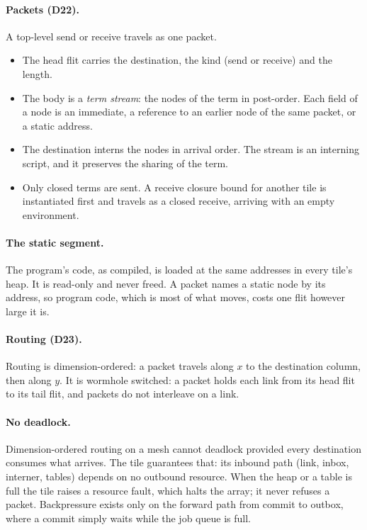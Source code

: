 \documentclass[11pt]{article}
\newcommand{\dec}[1]{\textbf{D#1}}
\theoremstyle{definition}
\theoremstyle{remark}
\begin{document}
\paragraph{Packets (\dec{22}).} A top-level send or receive travels as one
packet.
\begin{itemize}
\item The head flit carries the destination, the kind (send or receive) and
the length.
\item The body is a \emph{term stream}: the nodes of the term in post-order.
Each field of a node is an immediate, a reference to an earlier node of the
same packet, or a static address.
\item The destination interns the nodes in arrival order. The stream is an
interning script, and it preserves the sharing of the term.
\item Only closed terms are sent. A receive closure bound for another tile is
instantiated first and travels as a closed receive, arriving with an empty
environment.
\end{itemize}

\paragraph{The static segment.} The program's code, as compiled, is loaded at
the same addresses in every tile's heap. It is read-only and never freed. A
packet names a static node by its address, so program code, which is most of
what moves, costs one flit however large it is.

\paragraph{Routing (\dec{23}).} Routing is dimension-ordered: a packet
travels along $x$ to the destination column, then along $y$. It is wormhole
switched: a packet holds each link from its head flit to its tail flit, and
packets do not interleave on a link.

\paragraph{No deadlock.} Dimension-ordered routing on a mesh cannot deadlock
provided every destination consumes what arrives. The tile guarantees that:
its inbound path (link, inbox, interner, tables) depends on no outbound
resource. When the heap or a table is full the tile raises a resource fault,
which halts the array; it never refuses a packet. Backpressure exists only on
the forward path from commit to outbox, where a commit simply waits while the
job queue is full.
\end{document}
